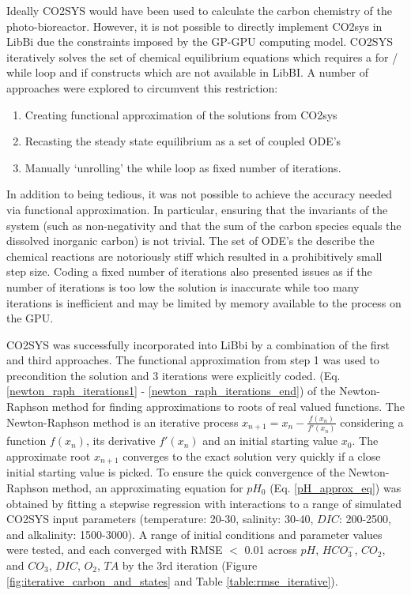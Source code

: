 \documentclass{ruthesis}
\begin{document}
Ideally CO2SYS \cite{lewis1998program} would have been used to calculate the carbon chemistry of the photo-bioreactor. 
However,  it is not possible to directly implement CO2sys in LibBi due the constraints imposed by the GP-GPU computing model.  CO2SYS iteratively solves the set of chemical equilibrium equations which requires a for / while loop and if constructs which are not available in LibBI. 
A number of approaches were explored to circumvent this restriction:
\begin{enumerate}
\item{} Creating functional approximation of the solutions from CO2sys
\item{} Recasting the steady state equilibrium as a set of coupled ODE's 
\item{} Manually `unrolling' the while loop as fixed number of iterations.  
\end{enumerate}

In addition to being tedious, it was not possible to achieve the accuracy needed via functional approximation.  
In particular, ensuring that the invariants of the system (such as non-negativity and that the sum of the carbon species equals the dissolved inorganic carbon) is not trivial. 
The set of ODE's the describe the chemical reactions are notoriously stiff \cite{zeebe1999time} which resulted in a prohibitively small step size.  Coding a fixed number of iterations also presented issues as if the number of iterations is too low the solution is inaccurate while too many iterations is inefficient and may be limited by memory available to the process on the GPU. 

CO2SYS was successfully incorporated into LiBbi  by a combination of the first and third approaches.  The functional approximation from step 1 was used to precondition the solution and 3 iterations were explicitly coded.  (Eq. \ref{newton_raph_iterations1} - \ref{newton_raph_iterations_end}) of the Newton-Raphson method for finding approximations to roots of real valued functions. The Newton-Raphson method is an iterative process 
$ x_{n+1} = x_n - \frac{f(x_n)}{f'(x_n)} $
considering a function $f(x_n)$, its derivative $f'(x_n)$ and an initial starting value $x_0$. The approximate root $x_{n+1}$ converges to the exact solution very quickly if a close initial starting value is picked. To ensure the quick convergence of the Newton-Raphson method, an approximating equation for $pH_0$ (Eq. \ref{pH_approx_eq}) was obtained by fitting a stepwise regression with interactions to a range of simulated CO2SYS input parameters (temperature: 20-30, salinity: 30-40, $DIC$: 200-2500, and alkalinity: 1500-3000). A range of initial conditions and parameter values were tested, and each converged with RMSE $<$ 0.01 across $pH$, $HCO_3^-$, $CO_2$, and $CO_3$, $DIC$, $O_2$, $TA$ by the 3rd iteration (Figure \ref{fig:iterative_carbon_and_states} and Table \ref{table:rmse_iterative}).
\end{document}
